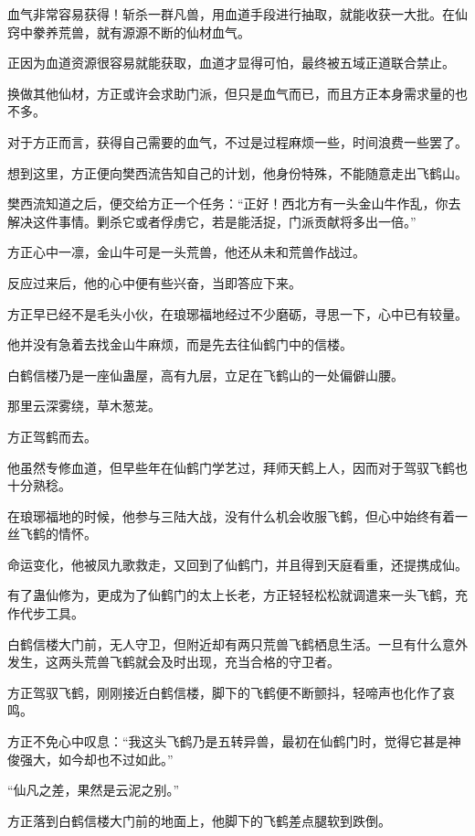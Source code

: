 
\begin{this_body}

血气非常容易获得！斩杀一群凡兽，用血道手段进行抽取，就能收获一大批。在仙窍中豢养荒兽，就有源源不断的仙材血气。

正因为血道资源很容易就能获取，血道才显得可怕，最终被五域正道联合禁止。

换做其他仙材，方正或许会求助门派，但只是血气而已，而且方正本身需求量的也不多。

对于方正而言，获得自己需要的血气，不过是过程麻烦一些，时间浪费一些罢了。

想到这里，方正便向樊西流告知自己的计划，他身份特殊，不能随意走出飞鹤山。

樊西流知道之后，便交给方正一个任务：“正好！西北方有一头金山牛作乱，你去解决这件事情。剿杀它或者俘虏它，若是能活捉，门派贡献将多出一倍。”

方正心中一凛，金山牛可是一头荒兽，他还从未和荒兽作战过。

反应过来后，他的心中便有些兴奋，当即答应下来。

方正早已经不是毛头小伙，在琅琊福地经过不少磨砺，寻思一下，心中已有较量。

他并没有急着去找金山牛麻烦，而是先去往仙鹤门中的信楼。

白鹤信楼乃是一座仙蛊屋，高有九层，立足在飞鹤山的一处偏僻山腰。

那里云深雾绕，草木葱茏。

方正驾鹤而去。

他虽然专修血道，但早些年在仙鹤门学艺过，拜师天鹤上人，因而对于驾驭飞鹤也十分熟稔。

在琅琊福地的时候，他参与三陆大战，没有什么机会收服飞鹤，但心中始终有着一丝飞鹤的情怀。

命运变化，他被凤九歌救走，又回到了仙鹤门，并且得到天庭看重，还提携成仙。

有了蛊仙修为，更成为了仙鹤门的太上长老，方正轻轻松松就调遣来一头飞鹤，充作代步工具。

白鹤信楼大门前，无人守卫，但附近却有两只荒兽飞鹤栖息生活。一旦有什么意外发生，这两头荒兽飞鹤就会及时出现，充当合格的守卫者。

方正驾驭飞鹤，刚刚接近白鹤信楼，脚下的飞鹤便不断颤抖，轻啼声也化作了哀鸣。

方正不免心中叹息：“我这头飞鹤乃是五转异兽，最初在仙鹤门时，觉得它甚是神俊强大，如今却也不过如此。”

“仙凡之差，果然是云泥之别。”

方正落到白鹤信楼大门前的地面上，他脚下的飞鹤差点腿软到跌倒。


\end{this_body}
